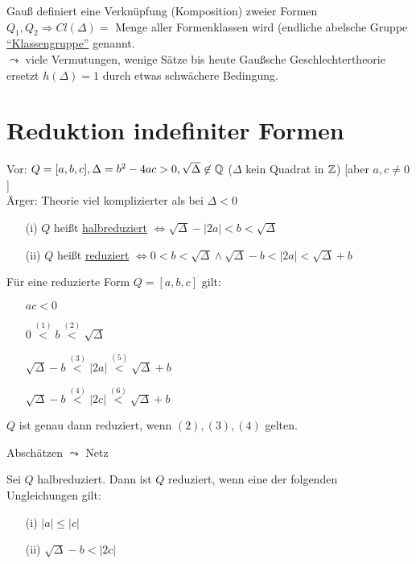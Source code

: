 \documentclass[a4paper,twoside,DIV15,BCOR12mm]{scrbook}
\begin{document}
Gauß definiert eine Verknüpfung (Komposition) zweier Formen $Q_1, Q_2 \Rightarrow Cl(\Delta) =$ Menge aller Formenklassen wird (endliche abelsche Gruppe \underline{"`Klassengruppe"'} genannt.\\
$\leadsto$ viele Vermutungen, wenige Sätze bis heute Gaußsche Geschlechtertheorie ersetzt $h(\Delta) = 1$ durch etwas schwächere Bedingung.

\section{Reduktion indefiniter Formen}

Vor: $Q = [a,b,c], \Delta = b^2 - 4ac > 0, \sqrt{\Delta} \not\in \mathbb{Q}$ ($\Delta$ kein Quadrat in $\mathbb{Z}$) [aber $a,c \not= 0$]\\
Ärger: Theorie viel komplizierter als bei $\Delta < 0$
\begin{definition}
\begin{itemize}
\item[(i)] $Q$ heißt \underline{halbreduziert} $\Leftrightarrow \sqrt{\Delta} - |2a| < b < \sqrt{\Delta}$
\item[(ii)] $Q$ heißt \underline{reduziert} $\Leftrightarrow 0 < b < \sqrt{\Delta} \wedge \sqrt{\Delta} - b < |2a| < \sqrt{\Delta} + b$
\end{itemize}
\end{definition}

\begin{satz}[Reduktionsungleichungen]
Für eine reduzierte Form $Q = [a,b,c]$ gilt:
\begin{itemize}
\item[] $ac < 0$
\item[] $0 \stackrel{(1)}{<} b \stackrel{(2)}{<} \sqrt{\Delta}$
\item[] $\sqrt{\Delta} - b \stackrel{(3)}{<} |2a| \stackrel{(5)}{<} \sqrt{\Delta} + b$
\item[] $\sqrt{\Delta} - b \stackrel{(4)}{<} |2c| \stackrel{(6)}{<} \sqrt{\Delta} + b$
\end{itemize}
$Q$ ist genau dann reduziert, wenn $(2), (3), (4)$ gelten.
\end{satz}

\begin{beweis}
Abschätzen $\leadsto$ Netz
\end{beweis}

\begin{folgerung}[Reduktionskriterium]
Sei $Q$ halbreduziert. Dann ist $Q$ reduziert, wenn eine der folgenden Ungleichungen gilt:
\begin{itemize}
\item[(i)] $|a| \le |c|$
\item[(ii)] $\sqrt{\Delta} - b < |2c|$
\end{itemize}
\end{folgerung}
\end{document}
